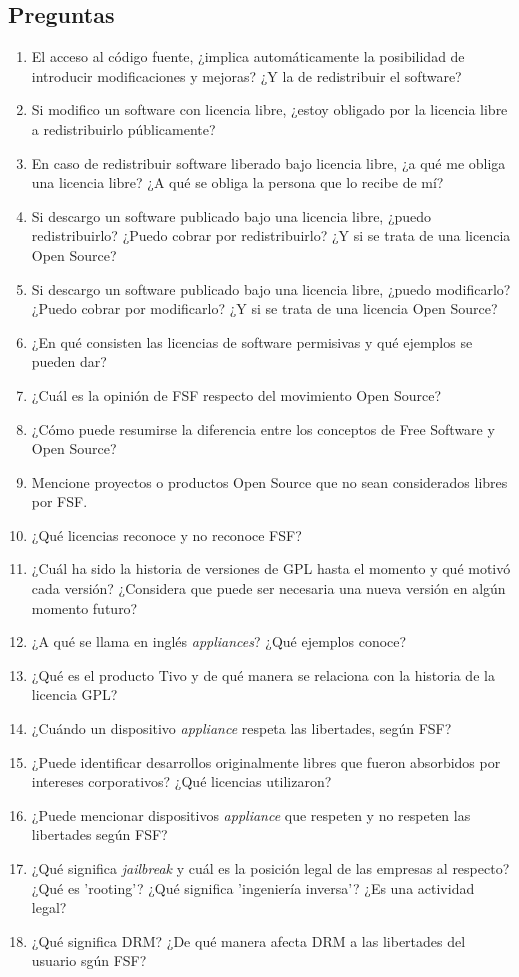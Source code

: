 \subsection{Preguntas}
\begin{enumerate}
	\item El acceso al código fuente, ¿implica automáticamente la posibilidad de introducir modificaciones y mejoras?  ¿Y la de redistribuir el software? 
	\item Si modifico un software con licencia libre, ¿estoy obligado por la licencia libre a redistribuirlo públicamente? 
	\item En caso de redistribuir software liberado bajo licencia libre, ¿a qué me obliga una licencia libre? ¿A qué se obliga la persona que lo recibe de mí?
	\item Si descargo un software publicado bajo una licencia libre, ¿puedo redistribuirlo? ¿Puedo cobrar por redistribuirlo? ¿Y si se trata de una licencia Open Source?
	\item Si descargo un software publicado bajo una licencia libre, ¿puedo modificarlo? ¿Puedo cobrar por modificarlo? ¿Y si se trata de una licencia Open Source?
	\item ¿En qué consisten las licencias de software permisivas y qué ejemplos se pueden dar?
	\item ¿Cuál es la opinión de FSF respecto del movimiento Open Source?
	\item ¿Cómo puede resumirse la diferencia entre los conceptos de Free Software y Open Source?
	\item Mencione proyectos o productos Open Source que no sean considerados libres por FSF.
	\item ¿Qué licencias reconoce y no reconoce FSF?
	\item ¿Cuál ha sido la historia de versiones de GPL hasta el momento y qué motivó cada versión? ¿Considera que puede ser necesaria una nueva versión en algún momento futuro?
	\item ¿A qué se llama en inglés \emph{appliances}? ¿Qué ejemplos conoce? 
	\item ¿Qué es el producto Tivo y de qué manera se relaciona con la historia de la licencia GPL?
	\item ¿Cuándo un dispositivo \emph{appliance} respeta las libertades, según FSF?
	\item ¿Puede identificar desarrollos originalmente libres que fueron absorbidos por intereses corporativos? ¿Qué licencias utilizaron?
	\item ¿Puede mencionar dispositivos \emph{appliance} que respeten y no respeten las libertades según FSF?

	\item ¿Qué significa \emph{jailbreak} y cuál es la posición legal de las empresas al respecto? ¿Qué es 'rooting'? ¿Qué significa 'ingeniería inversa'? ¿Es una actividad legal? 

	\item ¿Qué significa DRM? ¿De qué manera afecta DRM a las libertades del usuario sgún FSF?

\end{enumerate}
